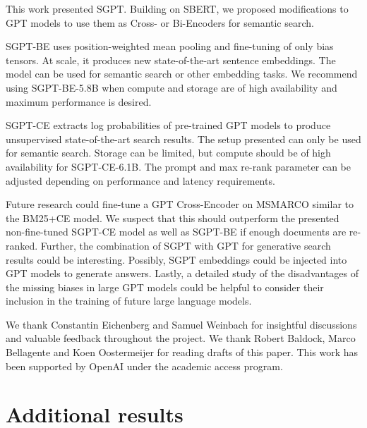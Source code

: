 \documentclass{article}
\begin{document}
This work presented SGPT. Building on SBERT, we proposed modifications to GPT models to use them as Cross- or Bi-Encoders for semantic search.

SGPT-BE uses position-weighted mean pooling and fine-tuning of only bias tensors. At scale, it produces new state-of-the-art sentence embeddings. The model can be used for semantic search or other embedding tasks. We recommend using SGPT-BE-5.8B when compute and storage are of high availability and maximum performance is desired.

SGPT-CE extracts log probabilities of pre-trained GPT models to produce unsupervised state-of-the-art search results. The setup presented can only be used for semantic search. Storage can be limited, but compute should be of high availability for SGPT-CE-6.1B. The prompt and max re-rank parameter can be adjusted depending on performance and latency requirements.

Future research could fine-tune a GPT Cross-Encoder on MSMARCO similar to the BM25+CE model. We suspect that this should outperform the presented non-fine-tuned SGPT-CE model as well as SGPT-BE if enough documents are re-ranked. Further, the combination of SGPT with GPT for generative search results could be interesting. Possibly, SGPT embeddings could be injected into GPT models to generate answers. Lastly, a detailed study of the disadvantages of the missing biases in large GPT models could be helpful to consider their inclusion in the training of future large language models.





\begin{ack}
We thank Constantin Eichenberg and Samuel Weinbach for insightful discussions and valuable feedback throughout the project. We thank Robert Baldock, Marco Bellagente and Koen Oostermeijer for reading drafts of this paper. This work has been supported by OpenAI under the academic access program. 
\end{ack}








\appendix

\clearpage

\section{Additional results}
\label{sec:results}
\end{document}
